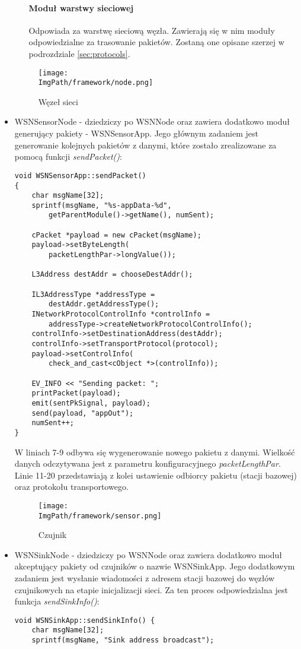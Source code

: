 \begin{itemize}
\begin{enumerate}
\paragraph{Moduł warstwy sieciowej} Odpowiada za warstwę sieciową węzła. Zawierają się w nim moduły odpowiedzialne za trasowanie pakietów. Zostaną one opisane szerzej w podrozdziale \ref{sec:protocols}.
\end{enumerate}
\begin{figure}[!htbp]
	\begin{center}
		\centering
		\texttt{[image: \\ImgPath/framework/node.png]} 
	\end{center}
	\caption{Węzeł sieci}
	\label{abstractNode}
\end{figure}
\FloatBarrier
	\item WSNSensorNode - dziedziczy po WSNNode oraz zawiera dodatkowo moduł generujący pakiety - WSNSensorApp. Jego głównym zadaniem jest generowanie kolejnych pakietów z danymi, które zostało zrealizowane za pomocą funkcji \textit{sendPacket()}:
\begin{verbatim}
void WSNSensorApp::sendPacket()
{
    char msgName[32];
    sprintf(msgName, "%s-appData-%d",
        getParentModule()->getName(), numSent);

    cPacket *payload = new cPacket(msgName);
    payload->setByteLength(
        packetLengthPar->longValue());

    L3Address destAddr = chooseDestAddr();

    IL3AddressType *addressType =
        destAddr.getAddressType();
    INetworkProtocolControlInfo *controlInfo =
        addressType->createNetworkProtocolControlInfo();
    controlInfo->setDestinationAddress(destAddr);
    controlInfo->setTransportProtocol(protocol);
    payload->setControlInfo(
        check_and_cast<cObject *>(controlInfo));

    EV_INFO << "Sending packet: ";
    printPacket(payload);
    emit(sentPkSignal, payload);
    send(payload, "appOut");
    numSent++;
}
\end{verbatim}
W liniach 7-9 odbywa się wygenerowanie nowego pakietu z danymi. Wielkość danych odczytywana jest z parametru konfiguracyjnego \textit{packetLengthPar}. Linie 11-20 przedstawiają z kolei ustawienie odbiorcy pakietu (stacji bazowej) oraz protokołu transportowego.
	\begin{figure}[!htbp]
	\begin{center}
		\centering
		\texttt{[image: \\ImgPath/framework/sensor.png]} 
	\end{center}
	\caption{Czujnik}
	\label{openlayers}
\end{figure}
\FloatBarrier
	\item WSNSinkNode - dziedziczy po WSNNode oraz zawiera dodatkowo moduł akceptujący pakiety od czujników o nazwie WSNSinkApp. Jego dodatkowym zadaniem jest wysłanie wiadomości z adresem stacji bazowej do węzłów czujnikowych na etapie inicjalizacji sieci. Za ten proces odpowiedzialna jest funkcja \textit{sendSinkInfo()}:
\begin{verbatim}
void WSNSinkApp::sendSinkInfo() {
    char msgName[32];
    sprintf(msgName, "Sink address broadcast");


\end{verbatim}
\end{itemize}
